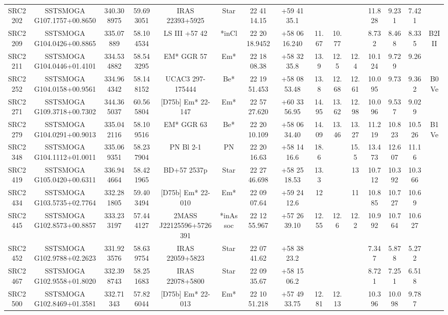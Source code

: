 \begin{table}
\begin{tabular}{ccccccccccccccc}
SRC2202 & SSTSMOGA G107.1757+00.8650 & 340.308975 & 59.693051 & IRAS 22393+5925 & Star & 22 41 14.15 & +59 41 35.1 &  &  &  & 11.828 & 9.231 & 7.421 &  \\
SRC2209 & SSTSMOGA G104.0426+00.8865 & 335.07889 & 58.104534 & LS III +57   42 & *inCl & 22 20 18.9452 & +58 06 16.240 & 11.67 & 10.77 &  & 8.732 & 8.468 & 8.335 & B2III \\
SRC2211 & SSTSMOGA G104.0446+01.4101 & 334.534882 & 58.543295 & EM* GGR   57 & Em* & 22 18 08.38 & +58 32 35.8 & 13.9 & 12.5 & 12.4 & 10.124 & 9.729 & 9.26 &  \\
SRC2252 & SSTSMOGA G104.0158+00.9561 & 334.964342 & 58.148152 & UCAC3 297-175444 & Be* & 22 19 51.453 & +58 08 53.48 & 13.8 & 12.68 & 12.61 & 10.095 & 9.73 & 9.362 & B0Ve \\
SRC2271 & SSTSMOGA G109.3718+00.7302 & 344.365037 & 60.565804 & [D75b] Em* 22-147 & Em* & 22 57 27.620 & +60 33 56.95 & 14.95 & 13.62 & 12.98 & 10.096 & 9.537 & 9.029 &  \\
SRC2279 & SSTSMOGA G104.0291+00.9013 & 335.042116 & 58.109516 & EM* GGR   63 & Be* & 22 20 10.109 & +58 06 34.40 & 14.09 & 13.46 & 13.27 & 11.219 & 10.823 & 10.526 & B1Ve \\
SRC2348 & SSTSMOGA G104.1112+01.0011 & 335.069351 & 58.237904 & PN Bl  2-1 & PN & 22 20 16.63 & +58 14 16.6 & 18.6 &  & 15.5 & 13.473 & 12.607 & 11.16 &  \\
SRC2419 & SSTSMOGA G105.0420+00.6311 & 336.944664 & 58.421965 & BD+57  2537p & Star & 22 27 46.698 & +58 25 18.53 & 13.3 &  & 13 & 10.712 & 10.392 & 10.366 &  \\
SRC2434 & SSTSMOGA G103.5735+02.7764 & 332.281805 & 59.403494 & [D75b] Em* 22-010 & Em* & 22 09 07.64 & +59 24 12.6 & 12 &  & 11 & 10.885 & 10.727 & 10.69 &  \\
SRC2445 & SSTSMOGA G102.8573+00.8857 & 333.233197 & 57.444127 & 2MASS J22125596+5726391 & *inAssoc & 22 12 55.967 & +57 26 39.10 & 12.55 & 12.6 & 12.2 & 10.992 & 10.764 & 10.627 &  \\
SRC2452 & SSTSMOGA G102.9788+02.2623 & 331.923576 & 58.639754 & IRAS 22059+5823 & Star & 22 07 41.62 & +58 38 23.2 &  &  &  & 7.347 & 5.878 & 5.272 &  \\
SRC2467 & SSTSMOGA G102.9558+01.8020 & 332.398743 & 58.251683 & IRAS 22078+5800 & Star & 22 09 35.67 & +58 15 06.2 &  &  &  & 8.721 & 7.251 & 6.518 &  \\
SRC2500 & SSTSMOGA G102.8469+01.3581 & 332.71343 & 57.826044 & [D75b] Em* 22-013 & Em* & 22 10 51.218 & +57 49 33.75 & 12.81 & 12.13 &  & 10.396 & 10.098 & 9.787 &  \\

\end{tabular}
\end{table}

